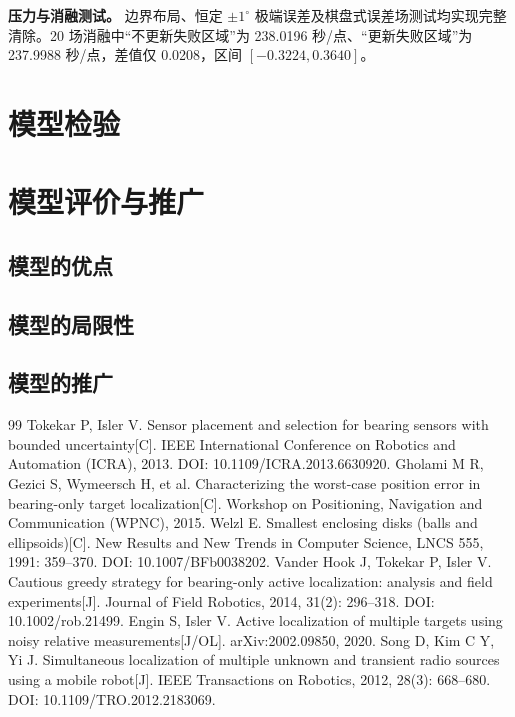 \documentclass[UTF8,a4paper,zihao=-4,fontset=none]{ctexart}
\begin{document}
\textbf{压力与消融测试。} 边界布局、恒定 \(\pm1^\circ\) 极端误差及棋盘式误差场测试均实现完整清除。20 场消融中“不更新失败区域”为 238.0196 秒/点、“更新失败区域”为 237.9988 秒/点，差值仅 0.0208，区间 \([-0.3224,0.3640]\)。

\section{模型检验}


\section{模型评价与推广}

\subsection{模型的优点}


\subsection{模型的局限性}


\subsection{模型的推广}


\begin{thebibliography}{99}
   Tokekar P, Isler V. Sensor placement and selection for bearing sensors with bounded uncertainty[C]. IEEE International Conference on Robotics and Automation (ICRA), 2013. DOI: 10.1109/ICRA.2013.6630920.
   Gholami M R, Gezici S, Wymeersch H, et al. Characterizing the worst-case position error in bearing-only target localization[C]. Workshop on Positioning, Navigation and Communication (WPNC), 2015.
   Welzl E. Smallest enclosing disks (balls and ellipsoids)[C]. New Results and New Trends in Computer Science, LNCS 555, 1991: 359--370. DOI: 10.1007/BFb0038202.
   Vander Hook J, Tokekar P, Isler V. Cautious greedy strategy for bearing-only active localization: analysis and field experiments[J]. Journal of Field Robotics, 2014, 31(2): 296--318. DOI: 10.1002/rob.21499.
   Engin S, Isler V. Active localization of multiple targets using noisy relative measurements[J/OL]. arXiv:2002.09850, 2020.
   Song D, Kim C Y, Yi J. Simultaneous localization of multiple unknown and transient radio sources using a mobile robot[J]. IEEE Transactions on Robotics, 2012, 28(3): 668--680. DOI: 10.1109/TRO.2012.2183069.
\end{thebibliography}
\end{document}
